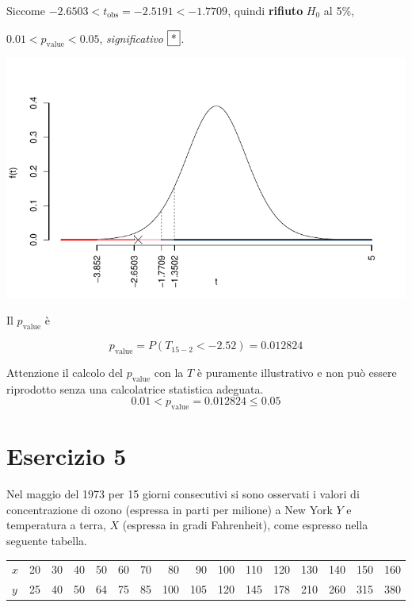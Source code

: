 \documentclass[
  11pt,
]{book}
\theoremstyle{mytheoremstyle}
\theoremstyle{mydefstyle}
\newenvironment{sol}
  {
  \begin{tcolorbox}[enhanced,breakable,arc=0.1mm,boxrule=1pt,colback=white,colframe=iblue,
  title=\bf \fontfamily{lmss}\selectfont \hspace{.5 cm} Soluzione,drop fuzzy shadow]

}{
\end{tcolorbox}
  }
\begin{document}
\begin{sol}
Siccome \(-2.6503<t_\text{obs}=-2.5191<-1.7709\), quindi \textbf{rifiuto} \(H_0\) al 5\%,

\(0.01<p_\text{value}<0.05\), \emph{significativo} \(\fbox{*}\).

\begin{center}\includegraphics{Esami_passati_con_soluzioni_files/figure-latex/06-regr-28,-1} \end{center}

Il \(p_{\text{value}}\) è

\[ p_{\text{value}} = P(T_{15-2}<-2.52)=0.012824 \]

Attenzione il calcolo del \(p_\text{value}\) con la \(T\) è puramente illustrativo e non può essere riprodotto senza una calcolatrice statistica adeguata.\[
 0.01 < p_\text{value}= 0.012824 \leq 0.05 
\]

\end{sol}

\section{Esercizio 5}\label{esercizio-5}

Nel maggio del 1973 per 15 giorni consecutivi si sono osservati i valori
di concentrazione di ozono (espressa in parti per milione) a New York \(Y\)
e temperatura a terra, \(X\) (espressa in gradi Fahrenheit), come espresso
nella seguente tabella.

\begin{table}[H]
\centering
\begin{tabular}{lrrrrrrrrrrrrrrr}
\toprule
$x$ & 20 & 30 & 40 & 50 & 60 & 70 & 80 & 90 & 100 & 110 & 120 & 130 & 140 & 150 & 160\\
$y$ & 25 & 40 & 50 & 64 & 75 & 85 & 100 & 105 & 120 & 145 & 178 & 210 & 260 & 315 & 380\\
\bottomrule
\end{tabular}
\end{table}
\end{document}
